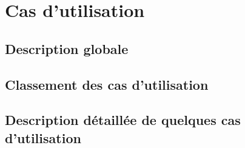 \chapter{Cas d'utilisation}

\section{Description globale}


\section{Classement des cas d'utilisation}


\section{Description détaillée de quelques cas d'utilisation}

